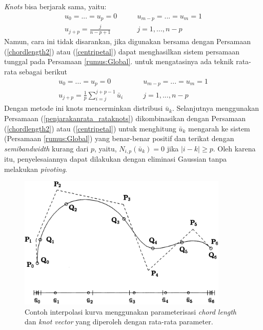 \textit{Knots} bisa berjarak sama, yaitu:
\begin{equation}
	\begin{split}
		u_0 = ... = u_p = 0 \qquad & u_{m-p} = ... = u_m = 1 \\
		u_{j+p} = \frac{j}{n-p+1} \qquad & j = 1, ..., n-p
	\end{split}
	\label{penjarakanknots}
\end{equation}
Namun, cara ini tidak disarankan, jika digunakan 
bersama dengan Persamaan (\ref{chordlength2}) 
atau (\ref{centripetal}) dapat menghasilkan sistem 
persamaan tunggal pada Persamaan \ref{rumus:Global}. 
untuk mengatasinya ada teknik rata-rata sebagai berikut
\begin{equation}
	\begin{split}
		u_0 = ... = u_p = 0 \qquad & u_{m-p} = ... = u_m = 1 \\
		u_{j+p} = \frac{1}{p}\sum_{i=j}^{j+p-1}\bar{u}_i \qquad & j = 1, ..., n-p
	\end{split}
	\label{penjarakanrata_rataknots}
\end{equation}
Dengan metode ini knots mencerminkan distribusi 
$\bar{u}_k$. Selanjutnya menggunakan Persamaan (\ref{penjarakanrata_rataknots}) 
dikombinasikan dengan Persamaan (\ref{chordlength2}) 
atau (\ref{centripetal}) untuk menghitung $\bar{u}_k$ 
mengarah ke sistem (Persamaan \ref{rumus:Global}) 
yang benar-benar positif dan terikat dengan 
\textit{semibandwidth} kurang dari $p$, yaitu, 
$N_{i,p}(\bar{u}_k) = 0$ jika $|i - k| \geq p$. 
Oleh karena itu, penyelesaiannya dapat dilakukan 
dengan eliminasi Gaussian tanpa melakukan \textit{pivoting}.

\begin{figure}[H]
	\centering
	\includegraphics[keepaspectratio, width=10cm]{gambar/Interpolasi/pic5.png}
	\caption{Contoh interpolasi kurva menggunakan 
	parameterisasi \textit{chord length} dan \textit{knot vector}  
	yang diperoleh dengan rata-rata parameter.}
	\label{gambar:contohchordlength}
\end{figure}

